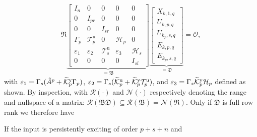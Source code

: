 \begin{align}
    \mathfrak{R}
    \underbrace{\begin{bmatrix}
        I_n      & 0      & 0       & 0 & 0\\
        0        & I_{pr} & 0       & 0 & 0\\
        0        & 0      & I_{sr}  & 0 & 0\\
        \Gamma_p & \mathcal{T}_p^\mathrm{u} & 0 & \mathcal{H}_p & 0\\
        \varepsilon_1 & \varepsilon_2 & \mathcal{T}_s^\mathrm{u} & \varepsilon_3 & \mathcal{H}_s\\
        0 & 0 & 0 & 0 & I_{sl}
    \end{bmatrix}}_{=\mathfrak{B}}
    \underbrace{\begin{bmatrix}
        X_{k,1,q}\\
        U_{k,p,q}\\
        U_{k_p,s,q}\\
        E_{k,p,q}\\
        E_{k_p,s,q}
    \end{bmatrix}}_{=\mathfrak{D}}=\mathcal{O},
\end{align}
with $\varepsilon_1=\Gamma_s(\tilde{A}^p+\widetilde{\mathcal{K}}_{p}^{\mathrm{{y}}}\Gamma_p)$, $\varepsilon_2=\Gamma_s(\widetilde{\mathcal{K}}_{p}^{\mathrm{{u}}}+\widetilde{\mathcal{K}}_{p}^{\mathrm{{y}}}\mathcal{T}_p^\mathrm{u})$, and $\varepsilon_3=\Gamma_s\widetilde{\mathcal{K}}_{p}^{\mathrm{{y}}}\mathcal{H}_p$ defined as shown. By inspection, with $\mathcal{R}(\cdot)$ and $\mathcal{N}(\cdot)$ respectively denoting the range and nullspace of a matrix: $\mathcal{R}(\mathfrak{B}\mathfrak{D})\subseteq\mathcal{R}(\mathfrak{B})=\mathcal{N}(\mathfrak{R})$. Only if $\mathfrak{D}$ is full row rank we therefore have

\begin{lem}
    If the input is persistently exciting of order $p+s+n$ and
\end{lem}



